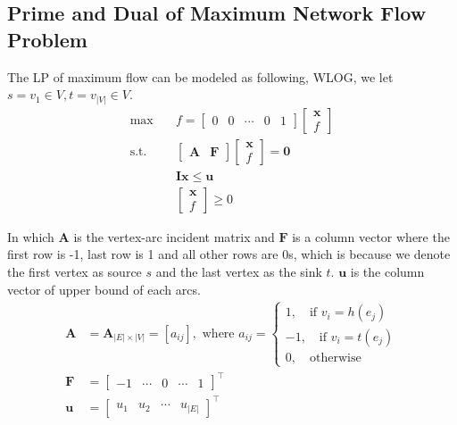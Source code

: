         \subsection{Prime and Dual of Maximum Network Flow Problem}
            The LP of maximum flow can be modeled as following, WLOG, we let $s = v_1 \in V, t = v_{|V|} \in V$.
            \begin{align*}
                \max \quad & f = \left[\begin{matrix}0 & 0 & \cdots & 0 & 1\end{matrix}\right]\left[\begin{matrix}\mathbf{x} \\ f\end{matrix}\right]\\
                \text{s.t.} \quad & \left[\begin{matrix}\mathbf{A} & \mathbf{F}\end{matrix}\right]\left[\begin{matrix}\mathbf{x}\\ f\end{matrix}\right] = \mathbf{0}\\
                & \mathbf{Ix} \le \mathbf{u}\\
                & \left[\begin{matrix}\mathbf{x}\\ f\end{matrix}\right] \ge 0
            \end{align*}

            In which $\mathbf{A}$ is the vertex-arc incident matrix and $\mathbf{F}$ is a column vector where the first row is -1, last row is 1 and all other rows are 0s, which is because we denote the first vertex as source $s$ and the last vertex as the sink $t$. $\mathbf{u}$ is the column vector of upper bound of each arcs.
            \begin{align*}
                \mathbf{A} &= \mathbf{A}_{|E|\times |V|} = [a_{ij}], \text{ where } a_{ij} = \begin{cases}
                    1, \quad \text{if $v_i = h(e_j)$} \\
                    -1, \quad \text{if $v_i = t(e_j)$} \\
                    0, \quad \text{otherwise}
                \end{cases}\\
                \mathbf{F} &= \left[\begin{matrix}-1 & \cdots & 0 & \cdots & 1\end{matrix}\right]^\top \\
                \mathbf{u} &= \left[\begin{matrix}u_1 & u_2 & \cdots & u_{|E|}\end{matrix}\right]^\top
            \end{align*}

